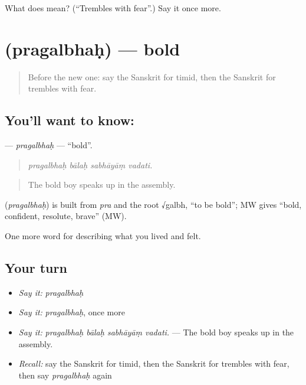 \begin{tcolorbox}[breakable,colback=teal!4,colframe=teal!35!black,title={Before you move on}]
What does  mean? (\textquotedblleft{}Trembles with fear\textquotedblright{}.) Say it once more.
\end{tcolorbox}
\section[\texorpdfstring{\sk{प्रगल्भः} (pragalbhaḥ)}{प्रगल्भः (pragalbhaḥ)}]{ (pragalbhaḥ) — bold}

\label{lesson:SA-C463-pragalbhah}



\begin{quote}
Before the new one: say the Sanskrit for timid, then the Sanskrit for trembles with fear.
\end{quote}

\subsection*{You'll want to know: }
\textbf{} — \emph{pragalbhaḥ} — \textquotedblleft{}bold\textquotedblright{}.

\begin{quote}
   
\end{quote}

\begin{quote}
\emph{pragalbhaḥ bālaḥ sabhāyāṃ vadati.}
\end{quote}

\begin{quote}
The bold boy speaks up in the assembly.
\end{quote}

\begin{cousinweb}
\textbf{} (\emph{pragalbhaḥ}) is built from \emph{pra} and the root √galbh, \textquotedblleft{}to be bold\textquotedblright{}; MW gives \textquotedblleft{}bold, confident, resolute, brave\textquotedblright{} (MW).
\end{cousinweb}

\begin{grammarlens}[title={What you've built}]
One more word for describing what you lived and felt.
\end{grammarlens}

\subsection*{Your turn}
\begin{itemize}
\raggedright
  \item \emph{Say it:} \emph{pragalbhaḥ}
  \item \emph{Say it:} \emph{pragalbhaḥ}, once more
  \item \emph{Say it:} \emph{pragalbhaḥ bālaḥ sabhāyāṃ vadati.} — The bold boy speaks up in the assembly.
  \item \emph{Recall:} say the Sanskrit for timid, then the Sanskrit for trembles with fear, then say \emph{pragalbhaḥ} again
\end{itemize}

